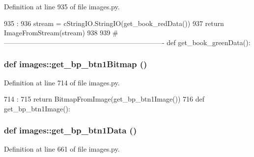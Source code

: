 Definition at line 935 of file images.py.


\begin{DoxyCode}
935                        :
936     stream = cStringIO.StringIO(get_book_redData())
937     return ImageFromStream(stream)
938 
939 #----------------------------------------------------------------------
def get_book_greenData():
\end{DoxyCode}
\hypertarget{namespaceimages_af839364a4b39a89450c1c11f55c066a8}{
\subsubsection[{get\_\-bp\_\-btn1Bitmap}]{\setlength{\rightskip}{0pt plus 5cm}def images::get\_\-bp\_\-btn1Bitmap ()}}
\label{namespaceimages_af839364a4b39a89450c1c11f55c066a8}


Definition at line 714 of file images.py.


\begin{DoxyCode}
714                        :
715     return BitmapFromImage(get_bp_btn1Image())
716 
def get_bp_btn1Image():
\end{DoxyCode}
\hypertarget{namespaceimages_a3dca1e8587b75029c624426a5d696834}{
\subsubsection[{get\_\-bp\_\-btn1Data}]{\setlength{\rightskip}{0pt plus 5cm}def images::get\_\-bp\_\-btn1Data ()}}
\label{namespaceimages_a3dca1e8587b75029c624426a5d696834}


Definition at line 661 of file images.py.


